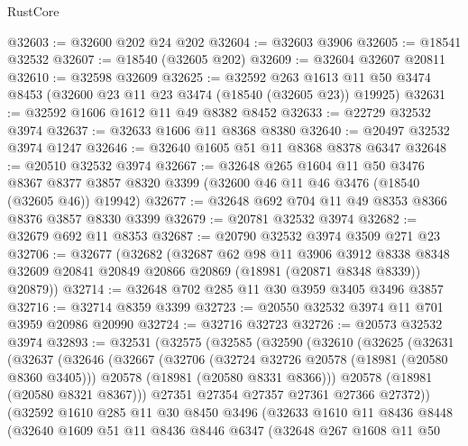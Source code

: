 \begin{lexlean}{RustCore}
\begin{coremodule}
@32603 := @32600 @202 @24 @202
@32604 := @32603 @3906
@32605 := @18541 @32532
@32607 := @18540 (@32605 @202)
@32609 := @32604 @32607 @20811
@32610 := @32598 @32609
@32625 := @32592
    @263
    @1613
    @11
    @50
    @3474
    @8453
    (@32600 @23 @11 @23 @3474 (@18540 (@32605 @23)) @19925)
@32631 := @32592 @1606 @1612 @11 @49 @8382 @8452
@32633 := @22729 @32532 @3974
@32637 := @32633 @1606 @11 @8368 @8380
@32640 := @20497 @32532 @3974 @1247
@32646 := @32640 @1605 @51 @11 @8368 @8378 @6347
@32648 := @20510 @32532 @3974
@32667 := @32648
    @265
    @1604
    @11
    @50
    @3476
    @8367
    @8377
    @3857
    @8320
    @3399
    (@32600 @46 @11 @46 @3476 (@18540 (@32605 @46)) @19942)
@32677 := @32648 @692 @704 @11 @49 @8353 @8366 @8376 @3857 @8330 @3399
@32679 := @20781 @32532 @3974
@32682 := @32679 @692 @11 @8353
@32687 := @20790 @32532 @3974 @3509 @271 @23
@32706 := @32677
    (@32682
      (@32687
        @62
        @98
        @11
        @3906
        @3912
        @8338
        @8348
        @32609
        @20841
        @20849
        @20866
        @20869
        (@18981 (@20871 @8348 @8339))
        @20879))
@32714 := @32648 @702 @285 @11 @30 @3959 @3405 @3496 @3857
@32716 := @32714 @8359 @3399
@32723 := @20550 @32532 @3974 @11 @701 @3959 @20986 @20990
@32724 := @32716 @32723
@32726 := @20573 @32532 @3974
@32893 := @32531
    (@32575
      (@32585
        (@32590
          (@32610
            (@32625
              (@32631
                (@32637
                  (@32646
                    (@32667
                      (@32706
                        (@32724 @32726 @20578 (@18981 (@20580 @8360 @3405)))
                        @20578
                        (@18981 (@20580 @8331 @8366)))
                      @20578
                      (@18981 (@20580 @8321 @8367)))
                    @27351
                    @27354
                    @27357
                    @27361
                    @27366
                    @27372))
                (@32592
                  @1610
                  @285
                  @11
                  @30
                  @8450
                  @3496
                  (@32633
                    @1610
                    @11
                    @8436
                    @8448
                    (@32640
                      @1609
                      @51
                      @11
                      @8436
                      @8446
                      @6347
                      (@32648
                        @267
                        @1608
                        @11
                        @50

\end{coremodule}
\end{lexlean}
